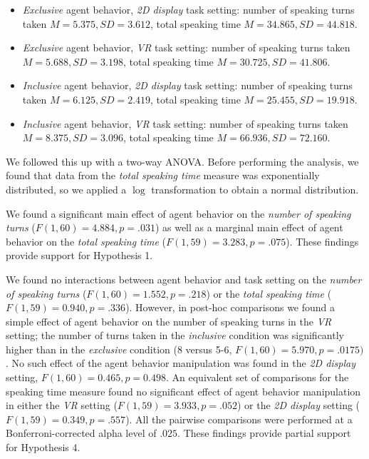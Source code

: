 \begin{itemize}
\item \emph{Exclusive} agent behavior, \emph{2D display} task setting: number of speaking turns taken $M = 5.375, SD = 3.612$, total speaking time $M = 34.865, SD = 44.818$.
\item \emph{Exclusive} agent behavior, \emph{VR} task setting: number of speaking turns taken $M = 5.688, SD = 3.198$, total speaking time $M = 30.725, SD = 41.806$.
\item \emph{Inclusive} agent behavior, \emph{2D display} task setting: number of speaking turns taken $M = 6.125, SD = 2.419$, total speaking time $M = 25.455, SD = 19.918$.
\item \emph{Inclusive} agent behavior, \emph{VR} task setting: number of speaking turns taken $M = 8.375, SD = 3.096$, total speaking time $M = 66.936, SD = 72.160$.
\end{itemize}

We followed this up with a two-way ANOVA. Before performing the analysis, we found that data from the \emph{total speaking time} measure was exponentially distributed, so we applied a $\log$ transformation to obtain a normal distribution.

We found a significant main effect of agent behavior on the \emph{number of speaking turns} ($F(1, 60) = 4.884, p = .031$) as well as a marginal main effect of agent behavior on the \emph{total speaking time} ($F(1, 59) = 3.283, p = .075$). These findings provide support for Hypothesis 1.

We found no interactions between agent behavior and task setting on the \emph{number of speaking turns} ($F(1, 60) = 1.552, p = .218$) or the \emph{total speaking time} ($F(1, 59) = 0.940, p = .336$). However, in post-hoc comparisons we found a simple effect of agent behavior on the number of speaking turns in the \emph{VR} setting; the number of turns taken in the \emph{inclusive} condition was significantly higher than in the \emph{exclusive} condition (8 versus 5-6, $F(1, 60) = 5.970, p = .0175)$. No such effect of the agent behavior manipulation was found in the \emph{2D display} setting, $F(1, 60) = 0.465, p = 0.498$. An equivalent set of comparisons for the speaking time measure found no significant effect of agent behavior manipulation in either the \emph{VR} setting ($F(1, 59) = 3.933, p = .052$) or the \emph{2D display} setting ($F(1, 59) = 0.349, p = .557$). All the pairwise comparisons were performed at a Bonferroni-corrected alpha level of $.025$. These findings provide partial support for Hypothesis 4.

